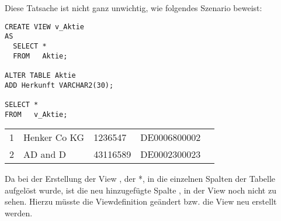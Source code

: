 \clearpage
        Diese Tatsache ist nicht ganz unwichtig, wie folgendes Szenario beweist:
        \begin{lstlisting}[language=oracle_sql,caption={Eine Szenario mit Tücke},label=sql08_28]
CREATE VIEW v_Aktie
AS
  SELECT *
  FROM   Aktie;

ALTER TABLE Aktie
ADD Herkunft VARCHAR2(30);

SELECT *
FROM   v_Aktie;
        \end{lstlisting}
        \begin{center}
          \begin{small}
            \tablehead{}
            \begin{msoraclesql}
              \begin{supertabular}{rllll}
                1 & Henker Co KG & 1236547 & DE0006800002  \\
                2 & AD and D & 43116589 & DE0002300023  \\
              \end{supertabular}
            \end{msoraclesql}
          \end{small}
        \end{center}
        Da bei der Erstellung der View , der *, in die einzelnen Spalten der Tabelle  aufgelöst wurde, ist die neu hinzugefügte Spalte , in der View  noch nicht zu sehen. Hierzu müsste die Viewdefinition geändert bzw. die View neu erstellt werden.

